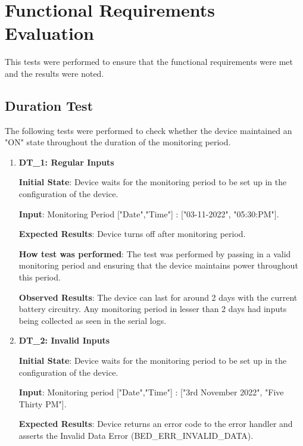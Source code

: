 \documentclass[12pt, titlepage]{article}
\begin{document}
\listoffigures %

\newpage


\section{Functional Requirements Evaluation}
This tests were performed to ensure that the functional requirements were met and the results were noted.
\subsection{Duration Test}

The following tests were performed to check whether the device maintained an "ON" state throughout the duration of the monitoring period.
\begin{enumerate}

  \item{\textbf{DT\_1: Regular Inputs}\\}\label{DT1}

  \textbf{Initial State}: Device waits for the monitoring period to be set up in the configuration of the device.

  \textbf{Input}: Monitoring Period ["Date","Time"]  : ["03-11-2022", "05:30:PM"].

  \textbf{Expected Results}: Device turns off after monitoring period.

  \textbf{How test was performed}: The test was performed by passing in a valid monitoring period and ensuring that the device maintains power throughout this period.

  \textbf{Observed Results}: The device can last for around 2 days with the current battery circuitry. Any monitoring period in lesser than 2 days had inputs being collected as seen in the serial logs.

  \item{\textbf{DT\_2: Invalid Inputs}\\}\label{DT2}

  \textbf{Initial State}: Device waits for the monitoring period to be set up in the configuration of the device.

  \textbf{Input}: Monitoring period ["Date","Time"] : ["3rd November 2022", "Five Thirty PM"].

  \textbf{Expected Results}: Device returns an error code to the error handler and asserts the Invalid Data Error (BED\_ERR\_INVALID\_DATA).


\end{enumerate}
\end{document}

